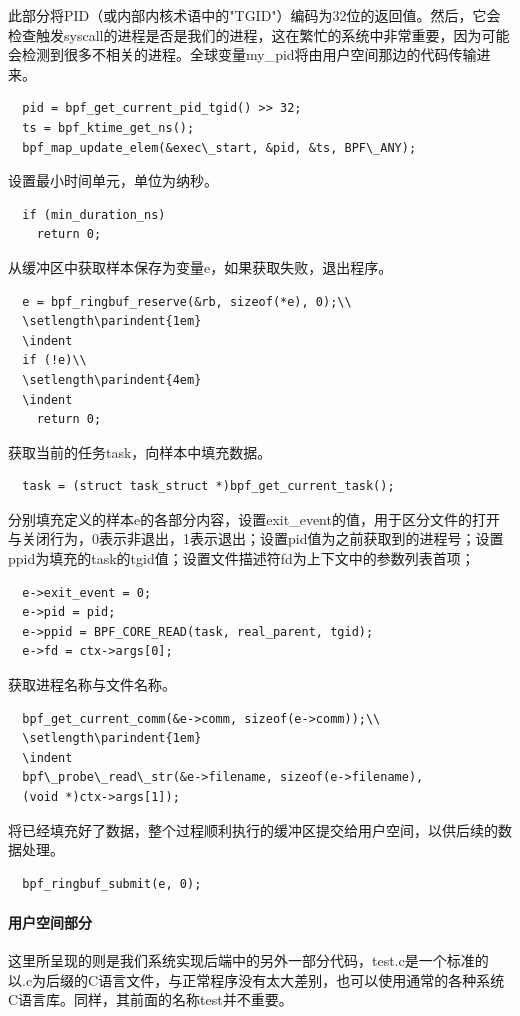 \documentclass[12pt,a4paper]{ctexart}
\begin{document}
此部分将PID（或内部内核术语中的"TGID"）编码为32位的返回值。然后，它会检查触发syscall的进程是否是我们的进程，这在繁忙的系统中非常重要，因为可能会检测到很多不相关的进程。全球变量my\_pid将由用户空间那边的代码传输进来。
\begin{lstlisting}
  pid = bpf_get_current_pid_tgid() >> 32;
  ts = bpf_ktime_get_ns();
  bpf_map_update_elem(&exec\_start, &pid, &ts, BPF\_ANY);
\end{lstlisting}
设置最小时间单元，单位为纳秒。
\begin{lstlisting}
  if (min_duration_ns)
    return 0;
\end{lstlisting}
从缓冲区中获取样本保存为变量e，如果获取失败，退出程序。
\begin{lstlisting}
  e = bpf_ringbuf_reserve(&rb, sizeof(*e), 0);\\
  \setlength\parindent{1em}
  \indent
  if (!e)\\
  \setlength\parindent{4em}
  \indent
    return 0;
\end{lstlisting}
获取当前的任务task，向样本中填充数据。
\begin{lstlisting}
  task = (struct task_struct *)bpf_get_current_task();
\end{lstlisting}

分别填充定义的样本e的各部分内容，设置exit\_event的值，用于区分文件的打开与关闭行为，0表示非退出，1表示退出；设置pid值为之前获取到的进程号；设置ppid为填充的task的tgid值；设置文件描述符fd为上下文中的参数列表首项；
\begin{lstlisting}
  e->exit_event = 0;
  e->pid = pid;
  e->ppid = BPF_CORE_READ(task, real_parent, tgid);
  e->fd = ctx->args[0];
\end{lstlisting}

获取进程名称与文件名称。
\begin{lstlisting}
  bpf_get_current_comm(&e->comm, sizeof(e->comm));\\
  \setlength\parindent{1em}
  \indent
  bpf\_probe\_read\_str(&e->filename, sizeof(e->filename),
  (void *)ctx->args[1]);
\end{lstlisting}
将已经填充好了数据，整个过程顺利执行的缓冲区提交给用户空间，以供后续的数据处理。
\begin{lstlisting}
  bpf_ringbuf_submit(e, 0);
\end{lstlisting}


\paragraph{用户空间部分}
这里所呈现的则是我们系统实现后端中的另外一部分代码，test.c是一个标准的以.c为后缀的C语言文件，与正常程序没有太大差别，也可以使用通常的各种系统C语言库。同样，其前面的名称test并不重要。
\end{document}
